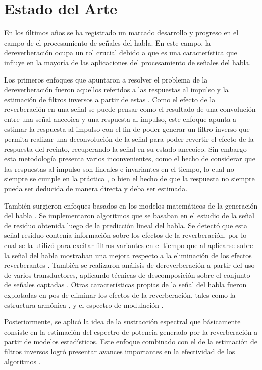 \section{Estado del Arte}
En los últimos años se ha registrado un marcado desarrollo y progreso en el campo de el procesamiento de señales del habla. En este campo, la dereverberación ocupa un rol crucial debido a que es una característica que influye en la mayoría de las aplicaciones del procesamiento de señales del habla.

Los primeros enfoques que apuntaron a resolver el problema de la dereverberación fueron aquellos referidos a las respuestas al impulso y la estimación de filtros inversos a partir de estas \cite{filtros_inv}. Como el efecto de la reverberación en una señal se puede pensar como el resultado de una convolución entre una señal anecoica y una respuesta al impulso, este enfoque apunta a estimar la respuesta al impulso con el fin de poder generar un filtro inverso que permita realizar una deconvolución de la señal para poder revertir el efecto de la respuesta del recinto, recuperando la señal en su estado anecoico. Sin embargo esta metodología presenta varios inconvenientes, como el hecho de considerar que las respuestas al impulso son lineales e invariantes en el tiempo, lo cual no siempre se cumple en la práctica \cite{LTI}, o bien el hecho de que la respuesta no siempre pueda ser deducida de manera directa y deba ser estimada. 


También surgieron enfoques basados en los modelos matemáticos de la generación del habla \cite{rabiner}. Se implementaron algoritmos que se basaban en el estudio de la señal de residuo obtenida luego de la predicción lineal del habla. Se detectó que esta señal residuo contenía información sobre los efectos de la reverberación, por lo cual se la utilizó para excitar filtros variantes en el tiempo que al aplicarse sobre la señal del habla mostraban una mejora respecto a la eliminación de los efectos reverberantes \cite{LPresiduo}. También se realizaron análisis de dereverberación a partir del uso de varios transductores, aplicando  técnicas de descomposición sobre el conjunto de señales captadas \cite{multichannel}. Otras características propias de la señal del habla fueron explotadas en pos de eliminar los efectos de la reverberación, tales como la estructura armónica \cite{armonica}, y el espectro de modulación \cite{mod}. 

Posteriormente, se aplicó la idea de la sustracción espectral \cite{spect_subtrac} \cite{spect_subtrac2} que básicamente consiste en la estimación del espectro de potencia generado por la reverberación a partir de modelos estadísticos. Este enfoque combinado con el de la estimación de filtros inversos logró presentar avances importantes en la efectividad de los algoritmos \cite{two_stage}.
 
